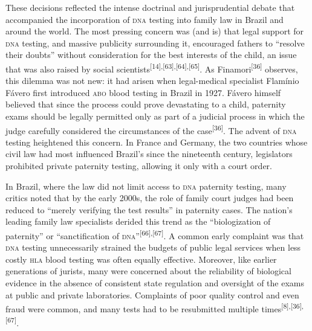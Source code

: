 \documentclass{article}
\begin{document}
These decisions reflected the intense doctrinal and jurisprudential debate that
accompanied the incorporation of \textsc{dna} testing into family law in Brazil and
around the world. The most pressing concern was (and is) that legal support for
\textsc{dna} testing, and massive publicity surrounding it, encouraged fathers to
“resolve their doubts” without consideration for the best interests of the
child, an issue that was also raised by social scientists\textsuperscript{[}\textsuperscript{14}\textsuperscript{]}\textsuperscript{,}\textsuperscript{[}\textsuperscript{63}\textsuperscript{]}\textsuperscript{,}\textsuperscript{[}\textsuperscript{64}\textsuperscript{]}\textsuperscript{,}\textsuperscript{[}\textsuperscript{65}\textsuperscript{]}. As Finamori\textsuperscript{[}\textsuperscript{36}\textsuperscript{]}
observes, this dilemma was not new: it had arisen when legal-medical specialist
Flamínio Fávero first introduced \textsc{abo} blood testing in Brazil in 1927. Fávero
himself believed that since the process could prove devastating to a child,
paternity exams should be legally permitted only as part of a judicial process
in which the judge carefully considered the circumstances of the case\textsuperscript{[}\textsuperscript{36}\textsuperscript{]}. The advent of \textsc{dna} testing heightened this concern. In France and Germany, the
two countries whose civil law had most influenced Brazil’s since the nineteenth
century, legislators prohibited private paternity testing, allowing it only with
a court order.

In Brazil, where the law did not limit access to \textsc{dna} paternity testing, many
critics noted that by the early 2000s, the role of family court judges had been
reduced to “merely verifying the test results” in paternity cases. The nation’s
leading family law specialists derided this trend as the “biologization of
paternity” or “sanctification of \textsc{dna}”\textsuperscript{[}\textsuperscript{66}\textsuperscript{]}\textsuperscript{,}\textsuperscript{[}\textsuperscript{67}\textsuperscript{]}. A common early complaint was that \textsc{dna} testing unnecessarily strained the
budgets of public legal services when less costly \textsc{hla} blood testing was often
equally effective. Moreover, like earlier generations of jurists, many were
concerned about the reliability of biological evidence in the absence of
consistent state regulation and oversight of the exams at public and private
laboratories. Complaints of poor quality control and even fraud were common, and
many tests had to be resubmitted multiple times\textsuperscript{[}\textsuperscript{8}\textsuperscript{]}\textsuperscript{,}\textsuperscript{[}\textsuperscript{36}\textsuperscript{]}\textsuperscript{,}\textsuperscript{[}\textsuperscript{67}\textsuperscript{]}.
\end{document}
